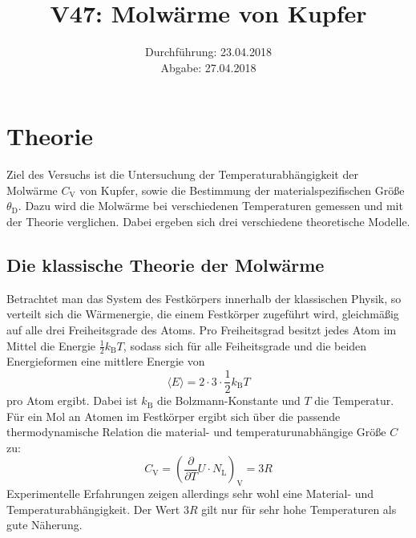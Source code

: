 \documentclass[
  bibliography=totoc,     %
  captions=tableheading,  %
  titlepage=firstiscover, %
]{scrartcl}
\title{V47: Molwärme von Kupfer}
\author{
  Simon Schulte
  \texorpdfstring{
    \\
    \href{mailto:simon.schulte@udo.edu}{simon.schulte@udo.edu}
  }{}
  \texorpdfstring{\and}{, }
  Tim Sedlaczek
  \texorpdfstring{
    \\
    \href{mailto:tim.sedlaczek@udo.edu}{tim.sedlaczek@udo.edu}
  }{}
}
\date{Durchführung: 23.04.2018\\
      Abgabe: 27.04.2018}
\begin{document}
\maketitle
\thispagestyle{empty}
\setcounter{page}{1}
\section{Theorie}
\label{sec:theorie}
Ziel des Versuchs ist die Untersuchung der Temperaturabhängigkeit der
Molwärme $C_{\mathrm{V}}$ von Kupfer, sowie die Bestimmung der
materialspezifischen Größe~$\theta_{\mathrm{D}}$. Dazu wird die Molwärme bei
verschiedenen Temperaturen gemessen und mit der Theorie verglichen. Dabei ergeben
sich drei verschiedene theoretische Modelle.
\subsection{Die klassische Theorie der Molwärme}
Betrachtet man das System des Festkörpers innerhalb der klassischen Physik, so
verteilt sich die Wärmenergie, die einem Festkörper zugeführt wird, gleichmäßig auf
alle drei Freiheitsgrade des Atoms. Pro
Freiheitsgrad besitzt jedes Atom im Mittel die
Energie $\frac{1}{2}k_{\mathrm{B}}T$, sodass sich für alle Feiheitsgrade und
die beiden Energieformen eine mittlere Energie von
%
\begin{equation}
   \langle E \rangle =2\cdot 3\cdot\frac{1}{2}k_{\mathrm{B}}T
\end{equation}
%
pro Atom ergibt. Dabei ist $k_{\mathrm{B}}$ die Bolzmann-Konstante und $T$ die
Temperatur. Für ein Mol an Atomen im Festkörper ergibt
sich über die passende thermodynamische Relation die material- und
temperaturunabhängige Größe $C$ zu:
%
\begin{equation}
  C_{\mathrm{V}}=\left(\frac{\partial}{\partial T}U\cdot N_{\mathrm{L}}\right)_{\mathrm{V}}=3R
  \label{eq:CV}
\end{equation}
%
Experimentelle Erfahrungen zeigen allerdings sehr wohl eine Material- und
Temperaturabhängigkeit. Der Wert $3R$ gilt nur für sehr hohe Temperaturen als
gute Näherung.
%
\end{document}
